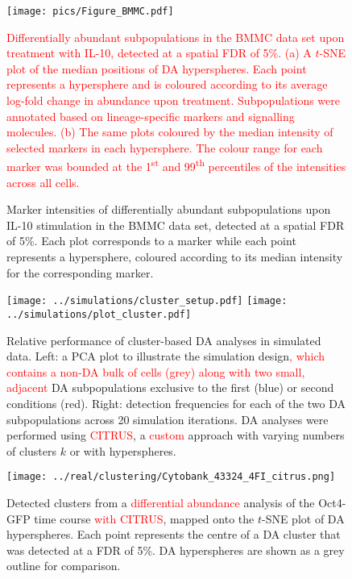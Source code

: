 \documentclass{article}
\newcommand\revised[1]{\textcolor{red}{#1}}
\begin{document}
\begin{figure}[p]
    \begin{center}
        \texttt{[image: pics/Figure\_BMMC.pdf]}
    \end{center}
    \caption{\revised{
            Differentially abundant subpopulations in the BMMC data set upon treatment with IL-10, detected at a spatial FDR of 5\%.
            (a) A $t$-SNE plot of the median positions of DA hyperspheres. 
            Each point represents a hypersphere and is coloured according to its average log-fold change in abundance upon treatment.
            Subpopulations were annotated based on lineage-specific markers and signalling molecules.
            (b) The same plots coloured by the median intensity of selected markers in each hypersphere.
            The colour range for each marker was bounded at the 1\textsuperscript{st} and 99\textsuperscript{th} percentiles of the intensities across all cells.
        }
    }
    \label{fig:bmmc}
\end{figure}

\begin{figure}[p]
    \begin{center}
    \end{center}
    \caption{
        Marker intensities of differentially abundant subpopulations upon IL-10 stimulation in the BMMC data set, detected at a spatial FDR of 5\%.
        Each plot corresponds to a marker while each point represents a hypersphere, coloured according to its median intensity for the corresponding marker.
    }
\end{figure}



\begin{figure}[p]
\begin{center}
\texttt{[image: ../simulations/cluster\_setup.pdf]}
\texttt{[image: ../simulations/plot\_cluster.pdf]}
\end{center}
\caption{Relative performance of cluster-based DA analyses in simulated data.
    Left: a PCA plot to illustrate the simulation design\revised{, which contains a non-DA bulk of cells (grey) along with two small, adjacent} DA subpopulations exclusive to the first (blue) or second conditions (red).
    Right: detection frequencies for each of the two DA subpopulations across 20 simulation iterations.
    DA analyses were performed using \revised{CITRUS}, a \revised{custom} approach with varying numbers of clusters $k$ or with hyperspheres.
}
\label{fig:clustersim}
\end{figure}

\begin{figure}[p]
\begin{center}
\texttt{[image: ../real/clustering/Cytobank\_43324\_4FI\_citrus.png]}
\end{center}
\caption{Detected clusters from a \revised{differential abundance} analysis of the Oct4-GFP time course \revised{with CITRUS}, mapped onto the $t$-SNE plot of DA hyperspheres.
Each point represents the centre of a DA cluster that was detected at a FDR of 5\%.
DA hyperspheres are shown as a grey outline for comparison.
}
\end{figure}
\end{document}
